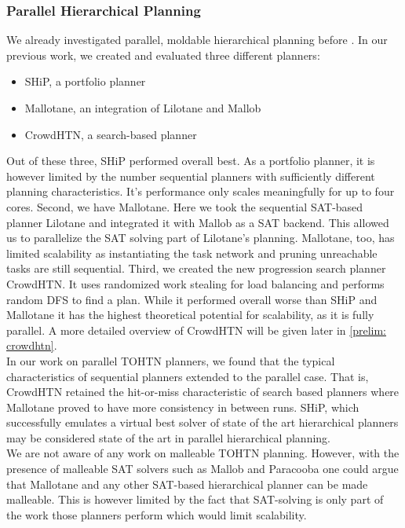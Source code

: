 \subsubsection{Parallel Hierarchical Planning}
We already investigated parallel, moldable hierarchical planning before \cite{bretl2021parallel}. In our previous work, we created and evaluated three different planners:
\begin{itemize}
	\item SHiP, a portfolio planner
	\item Mallotane, an integration of Lilotane and Mallob
	\item CrowdHTN, a search-based planner
\end{itemize}
Out of these three, SHiP performed overall best. As a portfolio planner, it is however limited by the number sequential planners with sufficiently different planning characteristics. It's performance only scales meaningfully for up to four cores. Second, we have Mallotane. Here we took the sequential SAT-based planner Lilotane and integrated it with Mallob as a SAT backend. This allowed us to parallelize the SAT solving part of Lilotane's planning. Mallotane, too, has limited scalability as instantiating the task network and pruning unreachable tasks are still sequential. Third, we created the new progression search planner CrowdHTN. It uses randomized work stealing for load balancing and performs random DFS to find a plan. While it performed overall worse than SHiP and Mallotane it has the highest theoretical potential for scalability, as it is fully parallel. A more detailed overview of CrowdHTN will be given later in \ref{prelim: crowdhtn}. \\
In our work on parallel TOHTN planners, we found that the typical characteristics of sequential planners extended to the parallel case. That is, CrowdHTN retained the hit-or-miss characteristic of search based planners where Mallotane proved to have more consistency in between runs. SHiP, which successfully emulates a virtual best solver of state of the art hierarchical planners may be considered state of the art in parallel hierarchical planning. \\
We are not aware of any work on malleable TOHTN planning. However, with the presence of malleable SAT solvers such as Mallob \cite{sanders2022decentralized} and Paracooba \cite{heisinger2020distributed} one could argue that Mallotane and any other SAT-based hierarchical planner can be made malleable. This is however limited by the fact that SAT-solving is only part of the work those planners perform which would limit scalability.